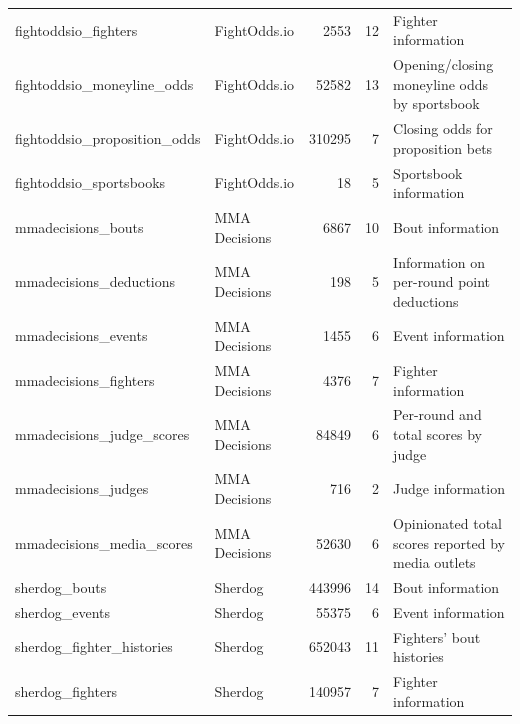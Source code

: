 \documentclass[12pt,twoside]{report}
\begin{document}
\begin{longtable}{llrrl}
fightoddsio\_fighters                   & FightOdds.io    & 2553    & 12         & Fighter information                                    \\
fightoddsio\_moneyline\_odds            & FightOdds.io    & 52582   & 13         & Opening/closing moneyline odds by sportsbook  \\
fightoddsio\_proposition\_odds          & FightOdds.io    & 310295  & 7          & Closing odds for proposition bets                      \\
fightoddsio\_sportsbooks                & FightOdds.io    & 18      & 5          & Sportsbook information                                 \\
mmadecisions\_bouts                     & MMA Decisions   & 6867    & 10         & Bout information                                       \\
mmadecisions\_deductions                & MMA Decisions   & 198     & 5          & Information on per-round point deductions              \\
mmadecisions\_events                    & MMA Decisions   & 1455    & 6          & Event information                                      \\
mmadecisions\_fighters                  & MMA Decisions   & 4376    & 7          & Fighter information                                    \\
mmadecisions\_judge\_scores             & MMA Decisions   & 84849   & 6          & Per-round and total scores by judge                    \\
mmadecisions\_judges                    & MMA Decisions   & 716     & 2          & Judge information                                      \\
mmadecisions\_media\_scores             & MMA Decisions   & 52630   & 6          & Opinionated total scores reported by media outlets     \\
sherdog\_bouts                          & Sherdog         & 443996  & 14         & Bout information                                       \\
sherdog\_events                         & Sherdog         & 55375   & 6          & Event information                                      \\
sherdog\_fighter\_histories             & Sherdog         & 652043  & 11         & Fighters' bout histories                               \\
sherdog\_fighters                       & Sherdog         & 140957  & 7          & Fighter information                                    \\

\end{longtable}
\end{document}
